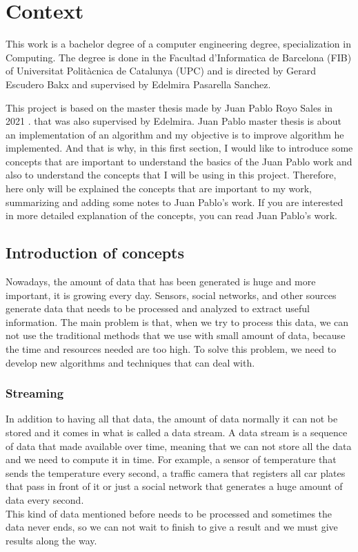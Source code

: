 \chapter{Context}
This work is a bachelor degree of a computer engineering degree, specialization in Computing.
The degree is done in the Facultad d'Informatica de Barcelona (FIB) of Universitat Politàcnica de Catalunya (UPC) and is directed by Gerard Escudero Bakx and supervised by Edelmira Pasarella Sanchez.

This project is based on the master thesis made by Juan Pablo Royo Sales in 2021 \cite{juan_pablo_royo_sales_incremental_2021}. that was also supervised by Edelmira.
Juan Pablo master thesis is about an implementation of an algorithm and my objective is to improve algorithm he implemented.
And that is why, in this first section, I would like to introduce some concepts that are important to understand the basics of the Juan Pablo work and also to understand the concepts that I will be using in this project.
Therefore, here only will be explained the concepts that are important to my work, summarizing and adding some notes to Juan Pablo's work.
If you are interested in more detailed explanation of the concepts, you can read Juan Pablo's work.

\section{Introduction of concepts}
Nowadays, the amount of data that has been generated is huge and more important, it is growing every day.
Sensors, social networks, and other sources generate data that needs to be processed and analyzed to extract useful information.
The main problem is that, when we try to process this data, we can not use the traditional methods that we use with small amount of data, because the time and resources needed are too high.
To solve this problem, we need to develop new algorithms and techniques that can deal with. \\
\subsection*{Streaming}
In addition to having all that data, the amount of data normally it can not be stored and it comes in what is called a data stream.
A data stream is a sequence of data that made available over time, meaning that we can not store all the data and we need to compute it in time.
For example, a sensor of temperature that sends the temperature every second, a traffic camera that registers all car plates that pass in front of it or just a social network that generates a huge amount of data every second.\\
This kind of data mentioned before needs to be processed and sometimes the data never ends, so we can not wait to finish to give a result and we must give results along the way.
